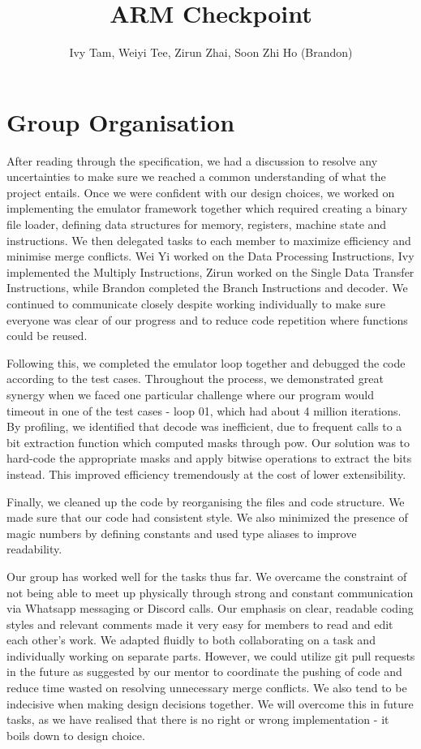 \documentclass[11pt]{article}
\begin{document}
\title{ARM Checkpoint}
\author{Ivy Tam, Weiyi Tee, Zirun Zhai, Soon Zhi Ho (Brandon)}

\maketitle

\section{Group Organisation}

After reading through the specification, we had a discussion to resolve any uncertainties to make sure we reached a common understanding of what the project entails. Once we were confident with our design choices, we worked on implementing the emulator framework together which required creating a binary file loader, defining data structures for memory, registers, machine state and instructions. We then delegated tasks to each member to maximize efficiency and minimise merge conflicts. Wei Yi worked on the Data Processing Instructions, Ivy implemented the Multiply Instructions, Zirun worked on the Single Data Transfer Instructions, while Brandon completed the Branch Instructions and decoder. We continued to communicate closely despite working individually to make sure everyone was clear of our progress and to reduce code repetition where functions could be reused. \par 
Following this, we completed the emulator loop together and debugged the code according to the test cases. Throughout the process, we demonstrated great synergy when we faced one particular challenge where our program would timeout in one of the test cases - loop 01, which had about 4 million iterations. By profiling, we identified that decode was inefficient, due to frequent calls to a bit extraction function which computed masks through pow. Our solution was to hard-code the appropriate masks and apply bitwise operations to extract the bits instead. This improved efficiency tremendously at the cost of lower extensibility. \par 
Finally, we cleaned up the code by reorganising the files and code structure. We made sure that our code had consistent style. We also minimized the presence of magic numbers by defining constants and used type aliases to improve readability. \par
Our group has worked well for the tasks thus far. We overcame the constraint of not being able to meet up physically through strong and constant communication via Whatsapp messaging or Discord calls. Our emphasis on clear, readable coding styles and relevant comments made it very easy for members to read and edit each other’s work. We adapted fluidly to both collaborating on a task and individually working on separate parts. However, we could utilize git pull requests in the future as suggested by our mentor to coordinate the pushing of code and reduce time wasted on resolving unnecessary merge conflicts. We also tend to be indecisive when making design decisions together. We will overcome this in future tasks, as we have realised that there is no right or wrong implementation - it boils down to design choice. \par
\break
\end{document}
